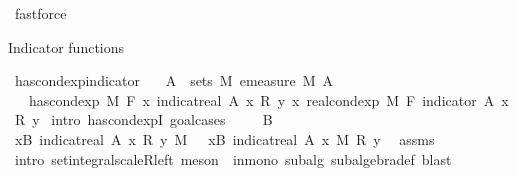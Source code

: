 \begin{isabellebody}
\ fastforce%
\endisatagproof
{\isafoldproof}%
%
\isadelimproof
%
\endisadelimproof
%
\begin{isamarkuptext}%
Indicator functions%
\end{isamarkuptext}\isamarkuptrue%
\isamarkupfalse%
\ has{\isacharunderscore}{\kern0pt}cond{\isacharunderscore}{\kern0pt}exp{\isacharunderscore}{\kern0pt}indicator{\isacharcolon}{\kern0pt}\isanewline
\ \ \ {\isachardoublequoteopen}A\ {\isasymin}\ sets\ M{\isachardoublequoteclose}\ {\isachardoublequoteopen}emeasure\ M\ A\ {\isacharless}{\kern0pt}\ {\isasyminfinity}{\isachardoublequoteclose}\isanewline
\ \ \ {\isachardoublequoteopen}has{\isacharunderscore}{\kern0pt}cond{\isacharunderscore}{\kern0pt}exp\ M\ F\ {\isacharparenleft}{\kern0pt}{\isasymlambda}x{\isachardot}{\kern0pt}\ indicat{\isacharunderscore}{\kern0pt}real\ A\ x\ {\isacharasterisk}{\kern0pt}\isactrlsub R\ y{\isacharparenright}{\kern0pt}\ {\isacharparenleft}{\kern0pt}{\isasymlambda}x{\isachardot}{\kern0pt}\ real{\isacharunderscore}{\kern0pt}cond{\isacharunderscore}{\kern0pt}exp\ M\ F\ {\isacharparenleft}{\kern0pt}indicator\ A{\isacharparenright}{\kern0pt}\ x\ {\isacharasterisk}{\kern0pt}\isactrlsub R\ y{\isacharparenright}{\kern0pt}{\isachardoublequoteclose}\isanewline
%
\isadelimproof
%
\endisadelimproof
%
\isatagproof
{}\isamarkupfalse%
\ {\isacharparenleft}{\kern0pt}intro\ has{\isacharunderscore}{\kern0pt}cond{\isacharunderscore}{\kern0pt}expI{\isacharprime}{\kern0pt}{\isacharcomma}{\kern0pt}\ goal{\isacharunderscore}{\kern0pt}cases{\isacharparenright}{\kern0pt}\isanewline
\ \ \isamarkupfalse%
\ {\isacharparenleft}{\kern0pt}{}\ B{\isacharparenright}{\kern0pt}\isanewline
\ \ \isamarkupfalse%
\ {\isachardoublequoteopen}{\isasymintegral}x{\isasymin}B{\isachardot}{\kern0pt}\ {\isacharparenleft}{\kern0pt}indicat{\isacharunderscore}{\kern0pt}real\ A\ x\ {\isacharasterisk}{\kern0pt}\isactrlsub R\ y{\isacharparenright}{\kern0pt}\ {\isasympartial}M\ \ {\isacharequal}{\kern0pt}\ {\isacharparenleft}{\kern0pt}{\isasymintegral}x{\isasymin}B{\isachardot}{\kern0pt}\ indicat{\isacharunderscore}{\kern0pt}real\ A\ x\ {\isasympartial}M{\isacharparenright}{\kern0pt}\ {\isacharasterisk}{\kern0pt}\isactrlsub R\ y{\isachardoublequoteclose}\ \isamarkupfalse%
\ assms\ \isamarkupfalse%
\ {\isacharparenleft}{\kern0pt}intro\ set{\isacharunderscore}{\kern0pt}integral{\isacharunderscore}{\kern0pt}scaleR{\isacharunderscore}{\kern0pt}left{\isacharcomma}{\kern0pt}\ meson\ {}\ in{\isacharunderscore}{\kern0pt}mono\ subalg\ subalgebra{\isacharunderscore}{\kern0pt}def{\isacharcomma}{\kern0pt}\ blast{\isacharparenright}{\kern0pt}\isanewline

\end{isabellebody}
